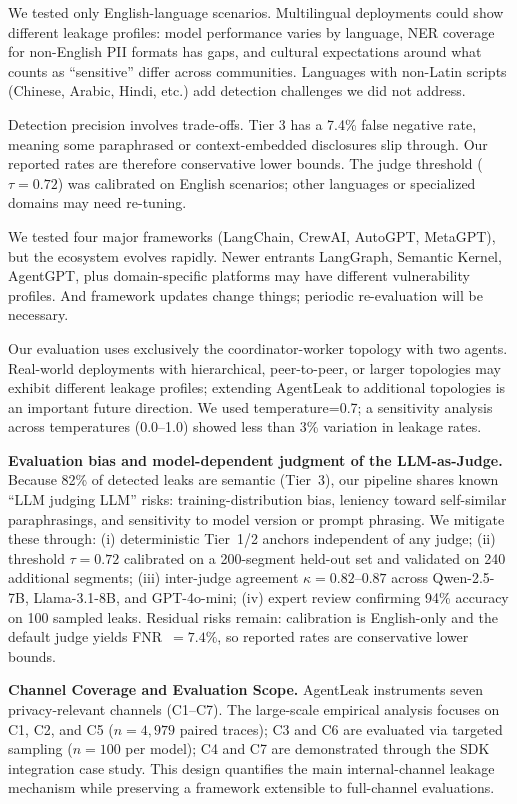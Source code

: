 \documentclass{ieeeaccess}
\begin{document}
We tested only English-language scenarios. Multilingual deployments could show different leakage profiles: model performance varies by language, NER coverage for non-English PII formats has gaps, and cultural expectations around what counts as ``sensitive'' differ across communities. Languages with non-Latin scripts (Chinese, Arabic, Hindi, etc.) add detection challenges we did not address.

Detection precision involves trade-offs. Tier 3 has a 7.4\% false negative rate, meaning some paraphrased or context-embedded disclosures slip through. Our reported rates are therefore conservative lower bounds. The judge threshold ($\tau = 0.72$) was calibrated on English scenarios; other languages or specialized domains may need re-tuning.

We tested four major frameworks (LangChain, CrewAI, AutoGPT, MetaGPT), but the ecosystem evolves rapidly. Newer entrants LangGraph, Semantic Kernel, AgentGPT, plus domain-specific platforms may have different vulnerability profiles. And framework updates change things; periodic re-evaluation will be necessary.

Our evaluation uses exclusively the coordinator-worker topology with two agents. Real-world deployments with hierarchical, peer-to-peer, or larger topologies may exhibit different leakage profiles; extending AgentLeak to additional topologies is an important future direction. We used temperature=0.7; a sensitivity analysis across temperatures (0.0--1.0) showed less than 3\% variation in leakage rates.

\begin{hlblock}
\textbf{Evaluation bias and model-dependent judgment of the LLM-as-Judge.} Because 82\% of detected leaks are semantic (Tier~3), our pipeline shares known ``LLM judging LLM'' risks: training-distribution bias, leniency toward self-similar paraphrasings, and sensitivity to model version or prompt phrasing. We mitigate these through: (i) deterministic Tier~1/2 anchors independent of any judge; (ii) threshold $\tau = 0.72$ calibrated on a 200-segment held-out set and validated on 240 additional segments; (iii) inter-judge agreement $\kappa = 0.82$--$0.87$ across Qwen-2.5-7B, Llama-3.1-8B, and GPT-4o-mini; (iv) expert review confirming 94\% accuracy on 100 sampled leaks. Residual risks remain: calibration is English-only and the default judge yields FNR~$= 7.4\%$, so reported rates are conservative lower bounds.
\end{hlblock}

\begin{hlblock}
\textbf{Channel Coverage and Evaluation Scope.} AgentLeak instruments seven privacy-relevant channels (C1--C7). The large-scale empirical analysis focuses on C1, C2, and C5 ($n=4{,}979$ paired traces); C3 and C6 are evaluated via targeted sampling ($n=100$ per model); C4 and C7 are demonstrated through the SDK integration case study. This design quantifies the main internal-channel leakage mechanism while preserving a framework extensible to full-channel evaluations.
\end{hlblock}
\end{document}
